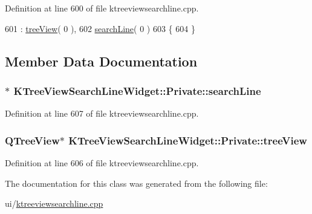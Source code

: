 Definition at line 600 of file ktreeviewsearchline.\+cpp.


\begin{DoxyCode}
601       : \hyperlink{classKTreeViewSearchLineWidget_1_1Private_aa2e92e4796bb45f14820994717e884ad}{treeView}( 0 ),
602         \hyperlink{classKTreeViewSearchLineWidget_1_1Private_a354d90831b2150cde3a076f3214b24c5}{searchLine}( 0 )
603     \{
604     \}
\end{DoxyCode}


\subsection{Member Data Documentation}
\hypertarget{classKTreeViewSearchLineWidget_1_1Private_a354d90831b2150cde3a076f3214b24c5}{
\subsubsection[{search\+Line}]{$\ast$ K\+Tree\+View\+Search\+Line\+Widget\+::\+Private\+::search\+Line}}\label{classKTreeViewSearchLineWidget_1_1Private_a354d90831b2150cde3a076f3214b24c5}


Definition at line 607 of file ktreeviewsearchline.\+cpp.

\hypertarget{classKTreeViewSearchLineWidget_1_1Private_aa2e92e4796bb45f14820994717e884ad}{
\subsubsection[{tree\+View}]{\setlength{\rightskip}{0pt plus 5cm}Q\+Tree\+View$\ast$ K\+Tree\+View\+Search\+Line\+Widget\+::\+Private\+::tree\+View}}\label{classKTreeViewSearchLineWidget_1_1Private_aa2e92e4796bb45f14820994717e884ad}


Definition at line 606 of file ktreeviewsearchline.\+cpp.



The documentation for this class was generated from the following file\+:\begin{DoxyCompactItemize}
\item 
ui/\hyperlink{ktreeviewsearchline_8cpp}{ktreeviewsearchline.\+cpp}\end{DoxyCompactItemize}
